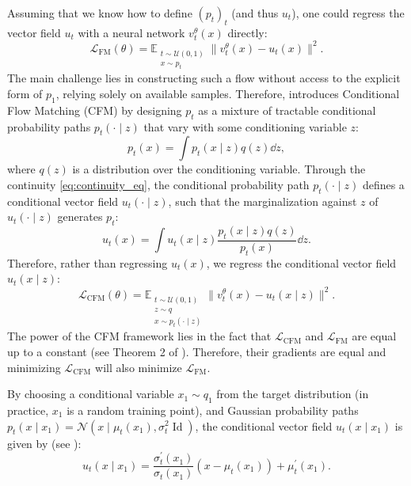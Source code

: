 \documentclass[10pt]{article} %
\theoremstyle{plain}
\theoremstyle{definition}
\theoremstyle{remark}
\begin{document}
Assuming that we know how to define $(p_t)_t$ (and thus $u_t$), one could regress the vector field $u_t$ with a neural network $v^\theta_t(x)$ directly:
\begin{equation*}
  \mathcal{L}_{\text{FM}}(\theta) = \mathbb{E}_{\substack{t\sim \mathcal{U}(0, 1)\\ x\sim p_t}} \lVert v_t^\theta(x) - u_t(x) \rVert^2.
\end{equation*}
The main challenge lies in constructing such a flow without access to the explicit form of $p_1$, relying solely on available samples. Therefore, \citet{lipmanFlowMatchingGenerative2023} introduces Conditional Flow Matching (CFM) by designing $p_t$ as a mixture of tractable conditional probability paths $p_t(\cdot\mid z)$ that vary with some conditioning variable $z$:
\begin{equation*}
  p_t(x)=\int p_t\left(x \mid z\right) q\left(z\right) \dd z,
\end{equation*}
where $q(z)$ is a distribution over the conditioning variable. Through the continuity \cref{eq:continuity_eq}, the conditional probability path $p_t(\cdot \mid z)$ defines a conditional vector field $u_t(\cdot\mid z)$, such that the marginalization against $z$ of $u_t(\cdot\mid z)$ generates $p_t$:
\begin{equation*}
  u_t(x)=\int u_t\left(x \mid z\right) \frac{p_t\left(x \mid z\right) q\left(z\right)}{p_t(x)} \dd z.
\end{equation*}
Therefore, rather than regressing $u_t(x)$, we regress the conditional vector field $u_t(x\mid z)$:
\begin{equation*}
  \mathcal{L}_{\text{CFM}}(\theta) = \mathbb{E}_{\substack{t\sim \mathcal{U}(0, 1)\\ z\sim q\\ x\sim p_t(\cdot\mid z)}} \big\| v_t^\theta(x) - u_t(x \mid z)\|^2.
\end{equation*}
The power of the CFM framework lies in the fact that $\mathcal{L}_{\text{CFM}}$ and $\mathcal{L}_{\text{FM}}$ are equal up to a constant (see Theorem 2 of \citealt{lipmanFlowMatchingGenerative2023}). Therefore, their gradients are equal and minimizing $\mathcal{L}_{\text{CFM}}$ will also minimize $\mathcal{L}_{\text{FM}}$.

By choosing a conditional variable $x_1 \sim q_1$ from the target distribution (in practice, $x_1$ is a random training point), and Gaussian probability paths $p_t(x\mid x_1)=\mathcal{N}(x \mid \mu_t(x_1), \sigma_t^2 \operatorname{Id})$, the conditional vector field $u_t\left(x \mid x_1\right)$ is given by (see \citealt{lipmanFlowMatchingGenerative2023}):
\begin{equation*}
  u_t\left(x \mid x_1\right)=\frac{\sigma_t^{\prime}\left(x_1\right)}{\sigma_t\left(x_1\right)}\left(x-\mu_t\left(x_1\right)\right)+\mu_t^{\prime}\left(x_1\right).
\end{equation*}
\end{document}

